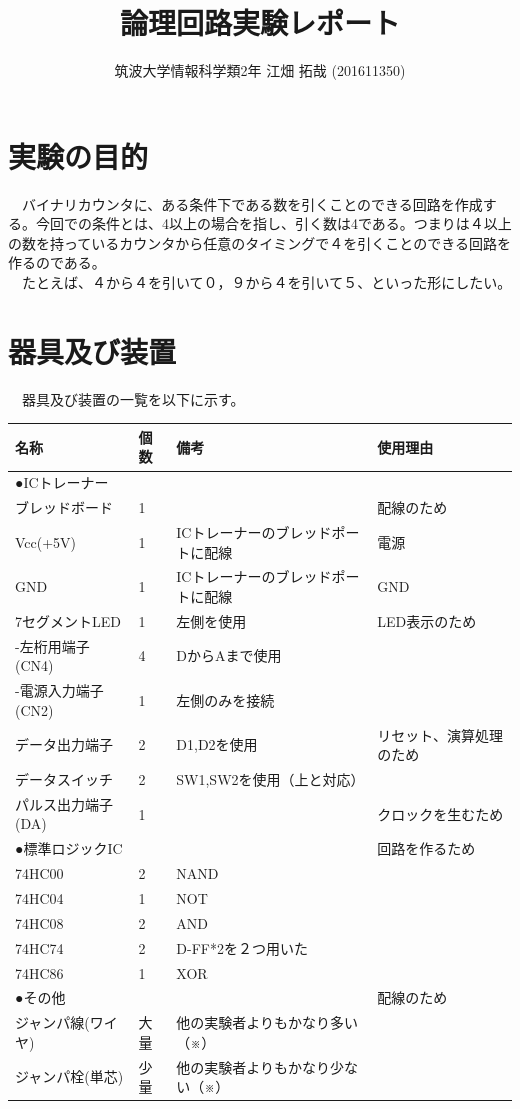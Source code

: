 \documentclass{scrartcl}
\author{筑波大学情報科学類2年 江畑 拓哉 (201611350)}
\date{}
\title{論理回路実験レポート}
\begin{document}
\maketitle


\section{実験の目的}
\label{sec:org267ad5e}
　バイナリカウンタに、ある条件下である数を引くことのできる回路を作成する。今回での条件とは、4以上の場合を指し、引く数は4である。つまりは４以上の数を持っているカウンタから任意のタイミングで４を引くことのできる回路を作るのである。\\
　たとえば、４から４を引いて０，９から４を引いて５、といった形にしたい。\\

\section{器具及び装置}
\label{sec:org348e921}
　器具及び装置の一覧を以下に示す。\\
\begin{center}
\begin{tabular}{|l|l|l|l|}
\hline
名称 & 個数 & 備考 & 使用理由\\
\hline
●ICトレーナー &  &  & \\
ブレッドボード & 1 &  & 配線のため\\
Vcc(+5V) & 1 & ICトレーナーのブレッドポートに配線 & 電源\\
GND & 1 & ICトレーナーのブレッドポートに配線 & GND\\
7セグメントLED & 1 & 左側を使用 & LED表示のため\\
-左桁用端子(CN4) & 4 & DからAまで使用 & \\
-電源入力端子(CN2) & 1 & 左側のみを接続 & \\
データ出力端子 & 2 & D1,D2を使用 & リセット、演算処理のため\\
データスイッチ & 2 & SW1,SW2を使用（上と対応） & \\
パルス出力端子(DA) & 1 &  & クロックを生むため\\
\hline
●標準ロジックIC &  &  & 回路を作るため\\
74HC00 & 2 & NAND & \\
74HC04 & 1 & NOT & \\
74HC08 & 2 & AND & \\
74HC74 & 2 & D-FF*2を２つ用いた & \\
74HC86 & 1 & XOR & \\
\hline
●その他 &  &  & 配線のため\\
ジャンパ線(ワイヤ) & 大量 & 他の実験者よりもかなり多い（※） & \\
ジャンパ栓(単芯) & 少量 & 他の実験者よりもかなり少ない（※） & \\
\hline
\end{tabular}
\end{center}
\end{document}
